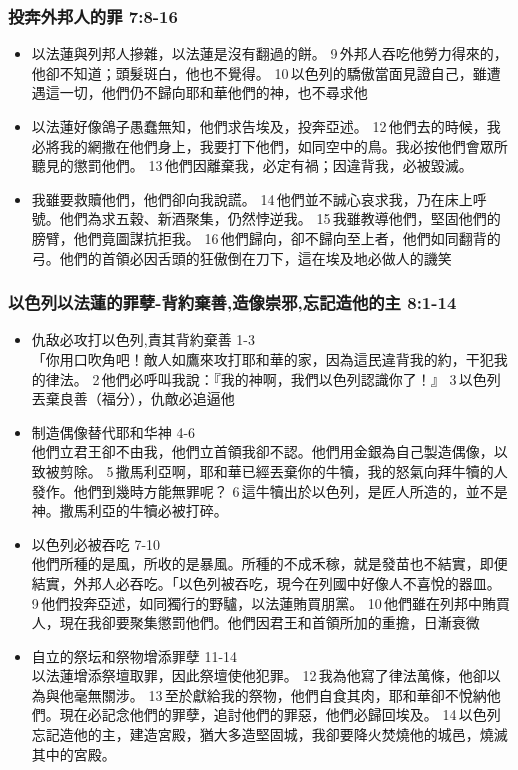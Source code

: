 \subsubsection{投奔外邦人的罪 7:8-16}
\begin{itemize}
\itemsep-.45em  
\item 以法蓮與列邦人摻雜，以法蓮是沒有翻過的餅。 9 外邦人吞吃他勞力得來的，他卻不知道；頭髮斑白，他也不覺得。 10 以色列的驕傲當面見證自己，雖遭遇這一切，他們仍不歸向耶和華他們的神，也不尋求他
\item 以法蓮好像鴿子愚蠢無知，他們求告埃及，投奔亞述。 12 他們去的時候，我必將我的網撒在他們身上，我要打下他們，如同空中的鳥。我必按他們會眾所聽見的懲罰他們。 13 他們因離棄我，必定有禍；因違背我，必被毀滅。
\item 我雖要救贖他們，他們卻向我說謊。 14 他們並不誠心哀求我，乃在床上呼號。他們為求五穀、新酒聚集，仍然悖逆我。 15 我雖教導他們，堅固他們的膀臂，他們竟圖謀抗拒我。 16 他們歸向，卻不歸向至上者，他們如同翻背的弓。他們的首領必因舌頭的狂傲倒在刀下，這在埃及地必做人的譏笑
\end{itemize}


\subsubsection{以色列以法蓮的罪孽-背約棄善,造像崇邪,忘記造他的主 8:1-14}
\begin{itemize}
\itemsep-.45em  
\item 仇敌必攻打以色列,責其背約棄善 1-3\\
「你用口吹角吧！敵人如鷹來攻打耶和華的家，因為這民違背我的約，干犯我的律法。 2 他們必呼叫我說：『我的神啊，我們以色列認識你了！』 3 以色列丟棄良善（福分），仇敵必追逼他
\item 制造偶像替代耶和华神 4-6\\
他們立君王卻不由我，他們立首領我卻不認。他們用金銀為自己製造偶像，以致被剪除。 5 撒馬利亞啊，耶和華已經丟棄你的牛犢，我的怒氣向拜牛犢的人發作。他們到幾時方能無罪呢？ 6 這牛犢出於以色列，是匠人所造的，並不是神。撒馬利亞的牛犢必被打碎。
\item 以色列必被吞吃 7-10\\
他們所種的是風，所收的是暴風。所種的不成禾稼，就是發苗也不結實，即便結實，外邦人必吞吃。「以色列被吞吃，現今在列國中好像人不喜悅的器皿。 9 他們投奔亞述，如同獨行的野驢，以法蓮賄買朋黨。 10 他們雖在列邦中賄買人，現在我卻要聚集懲罰他們。他們因君王和首領所加的重擔，日漸衰微
\item 自立的祭坛和祭物增添罪孽 11-14\\
以法蓮增添祭壇取罪，因此祭壇使他犯罪。 12 我為他寫了律法萬條，他卻以為與他毫無關涉。 13 至於獻給我的祭物，他們自食其肉，耶和華卻不悅納他們。現在必記念他們的罪孽，追討他們的罪惡，他們必歸回埃及。 14 以色列忘記造他的主，建造宮殿，猶大多造堅固城，我卻要降火焚燒他的城邑，燒滅其中的宮殿。
\end{itemize}


